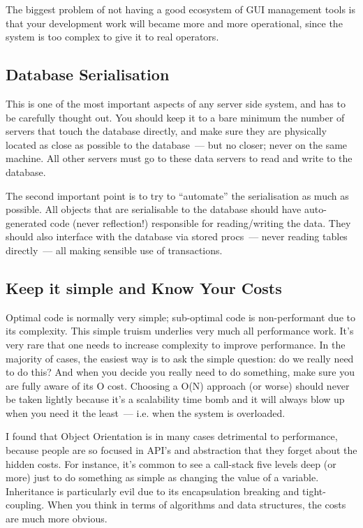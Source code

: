 \documentclass{book}
\begin{document}
The biggest problem of not having a good ecosystem of GUI management
tools is that your development work will became more and more
operational, since the system is too complex to give it to real
operators.

\subsection{Database Serialisation}

This is one of the most important aspects of any server side system,
and has to be carefully thought out. You should keep it to a bare
minimum the number of servers that touch the database directly, and
make sure they are physically located as close as possible to the
database~--- but no closer; never on the same machine. All other
servers must go to these data servers to read and write to the
database.

The second important point is to try to ``automate'' the serialisation
as much as possible. All objects that are serialisable to the database
should have auto-generated code (never reflection!) responsible for
reading/writing the data. They should also interface with the database
via stored procs~--- never reading tables directly~--- all making
sensible use of transactions.

\subsection{Keep it simple and Know Your Costs}

Optimal code is normally very simple; sub-optimal code is
non-performant due to its complexity. This simple truism underlies
very much all performance work. It's very rare that one needs to
increase complexity to improve performance. In the majority of cases,
the easiest way is to ask the simple question: do we really need to do
this? And when you decide you really need to do something, make sure
you are fully aware of its O cost. Choosing a O(N) approach (or worse)
should never be taken lightly because it's a scalability time bomb and
it will always blow up when you need it the least~--- i.e. when the
system is overloaded.

I found that Object Orientation is in many cases detrimental to
performance, because people are so focused in API's and abstraction
that they forget about the hidden costs. For instance, it's common to
see a call-stack five levels deep (or more) just to do something as
simple as changing the value of a variable. Inheritance is
particularly evil due to its encapsulation breaking and
tight-coupling. When you think in terms of algorithms and data
structures, the costs are much more obvious.
\end{document}
